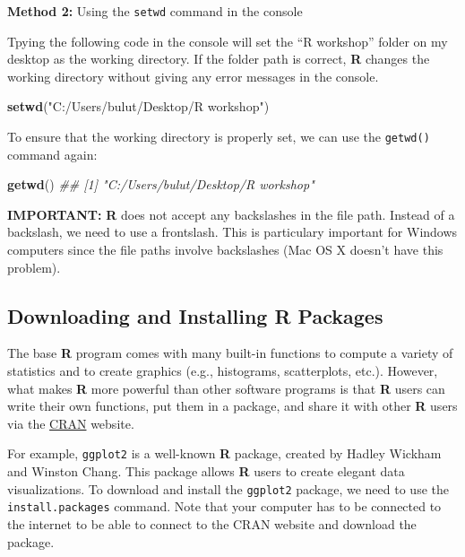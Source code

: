 \documentclass[]{book}
\newenvironment{Shaded}{\begin{snugshade}}{\end{snugshade}}
\newcommand{\CommentTok}[1]{\textcolor[rgb]{0.56,0.35,0.01}{\textit{#1}}}
\newcommand{\KeywordTok}[1]{\textcolor[rgb]{0.13,0.29,0.53}{\textbf{#1}}}
\newcommand{\NormalTok}[1]{#1}
\newcommand{\StringTok}[1]{\textcolor[rgb]{0.31,0.60,0.02}{#1}}
\begin{document}
\textbf{Method 2:} Using the \texttt{setwd} command in the console

Tpying the following code in the console will set the ``R workshop'' folder on my desktop as the working directory. If the folder path is correct, \textbf{R} changes the working directory without giving any error messages in the console.

\begin{Shaded}
\begin{Highlighting}[]
\KeywordTok{setwd}\NormalTok{(}\StringTok{"C:/Users/bulut/Desktop/R workshop"}\NormalTok{)}
\end{Highlighting}
\end{Shaded}

To ensure that the working directory is properly set, we can use the \texttt{getwd()} command again:

\begin{Shaded}
\begin{Highlighting}[]
\KeywordTok{getwd}\NormalTok{()}
\CommentTok{## [1] "C:/Users/bulut/Desktop/R workshop"}
\end{Highlighting}
\end{Shaded}

\textbf{IMPORTANT:} \textbf{R} does not accept any backslashes in the file path. Instead of a backslash, we need to use a frontslash. This is particulary important for Windows computers since the file paths involve backslashes (Mac OS X doesn't have this problem).

\hypertarget{downloading-and-installing-r-packages}{%
\subsection{\texorpdfstring{Downloading and Installing \textbf{R} Packages}{Downloading and Installing R Packages}}\label{downloading-and-installing-r-packages}}

The base \textbf{R} program comes with many built-in functions to compute a variety of statistics and to create graphics (e.g., histograms, scatterplots, etc.). However, what makes \textbf{R} more powerful than other software programs is that \textbf{R} users can write their own functions, put them in a package, and share it with other \textbf{R} users via the \href{https://cran.r-project.org/web/packages/index.html}{CRAN} website.

For example, \texttt{ggplot2} \citep{R-ggplot2} is a well-known \textbf{R} package, created by Hadley Wickham and Winston Chang. This package allows \textbf{R} users to create elegant data visualizations. To download and install the \texttt{ggplot2} package, we need to use the \texttt{install.packages} command. Note that your computer has to be connected to the internet to be able to connect to the CRAN website and download the package.
\end{document}
